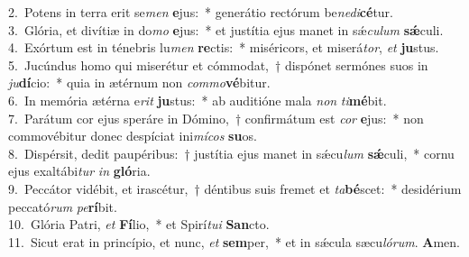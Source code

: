 {2.~}Potens in terra erit se\textit{men} \textbf{e}jus:~* generátio rectórum be\textit{ne}\textit{di}\textbf{cé}tur.\\
{3.~}Glória, et divítiæ in do\textit{mo} \textbf{e}jus:~* et justítia ejus manet in sǽ\textit{cu}\textit{lum} \textbf{sǽ}culi.\\
{4.~}Exórtum est in ténebris lu\textit{men} \textbf{re}ctis:~* miséricors, et miserá\textit{tor}, \textit{et} \textbf{ju}stus.\\
{5.~}Jucúndus homo qui miserétur et cómmodat,~† dispónet sermónes suos in \textit{ju}\textbf{dí}cio:~* quia in ætérnum non \textit{com}\textit{mo}\textbf{vé}bitur.\\
{6.~}In memória ætérna e\textit{rit} \textbf{ju}stus:~* ab auditióne mala \textit{non} \textit{ti}\textbf{mé}bit.\\
{7.~}Parátum cor ejus speráre in Dómino,~† confirmátum est \textit{cor} \textbf{e}jus:~* non commovébitur donec despíciat ini\textit{mí}\textit{cos} \textbf{su}os.\\
{8.~}Dispérsit, dedit paupéribus:~† justítia ejus manet in sǽcu\textit{lum} \textbf{sǽ}culi,~* cornu ejus exaltábi\textit{tur} \textit{in} \textbf{gló}ria.\\
{9.~}Peccátor vidébit, et irascétur,~† déntibus suis fremet et \textit{ta}\textbf{bé}scet:~* desidérium peccató\textit{rum} \textit{pe}\textbf{rí}bit.\\
{10.~}Glória Patri, \textit{et} \textbf{Fí}lio,~* et Spirí\textit{tu}\textit{i} \textbf{San}cto.\\
{11.~}Sicut erat in princípio, et nunc, \textit{et} \textbf{sem}per,~* et in sǽcula sæcu\textit{ló}\textit{rum}. \textbf{A}men.\\
